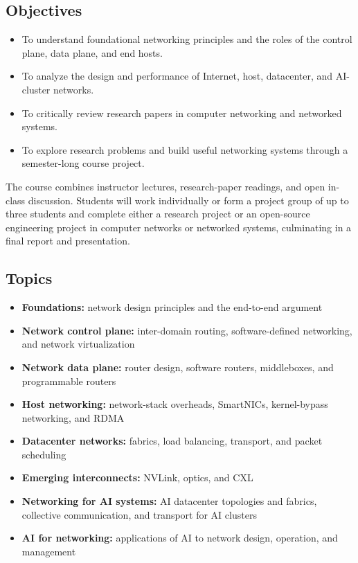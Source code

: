 \documentclass[11pt]{article}
\begin{document}
\subsection{Objectives}
\begin{itemize}
  \item To understand foundational networking principles and the roles of the control plane, data plane, and end hosts.
  \item To analyze the design and performance of Internet, host, datacenter, and AI-cluster networks.
  \item To critically review research papers in computer networking and networked systems.
  \item To explore research problems and build useful networking systems through a semester-long course project.
\end{itemize}

The course combines instructor lectures, research-paper readings, and open
in-class discussion. Students will work individually or form a project group of
up to three students and complete either a research project or an open-source
engineering project in computer networks or networked systems, culminating in a
final report and presentation.

\subsection{Topics}
\begin{itemize}
  \item \textbf{Foundations:} network design principles and the end-to-end argument
  \item \textbf{Network control plane:} inter-domain routing, software-defined networking, and network virtualization
  \item \textbf{Network data plane:} router design, software routers, middleboxes, and programmable routers
  \item \textbf{Host networking:} network-stack overheads, SmartNICs, kernel-bypass networking, and RDMA
  \item \textbf{Datacenter networks:} fabrics, load balancing, transport, and packet scheduling
  \item \textbf{Emerging interconnects:} NVLink, optics, and CXL
  \item \textbf{Networking for AI systems:} AI datacenter topologies and fabrics, collective communication, and transport for AI clusters
  \item \textbf{AI for networking:} applications of AI to network design, operation, and management
\end{itemize}
\end{document}
